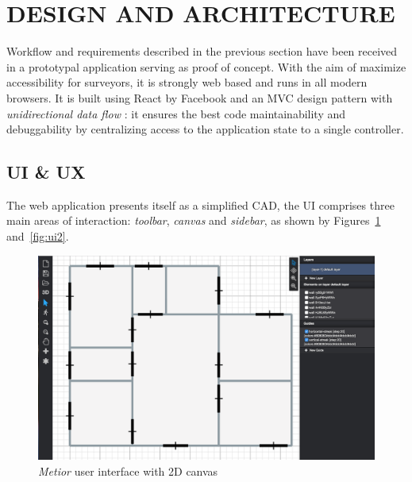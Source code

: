 \section{\uppercase{Design and Architecture}}
\label{sec:architecture}

\noindent Workflow and requirements described in the previous section have been received in a prototypal application serving as proof of concept. With the aim of maximize accessibility for surveyors, it is strongly web based and runs in all modern browsers. It is built using React by Facebook and an MVC design pattern with \emph{unidirectional data flow} \cite{redux}:  it ensures the best code maintainability and debuggability by centralizing access to the application state to a single controller.

\subsection{UI \& UX}

The web application presents itself as a simplified CAD,  the UI comprises three main areas of interaction: \emph{toolbar}, \emph{canvas} and \emph{sidebar}, as shown by Figures~\ref{fig:ui} and~\ref{fig:ui2}.

\begin{figure}[htbp] %
   \centering
   \includegraphics[width=1\linewidth]{images/2d}
   \caption{\emph{Metior} user interface with 2D canvas}
   \label{fig:ui}
\end{figure}


